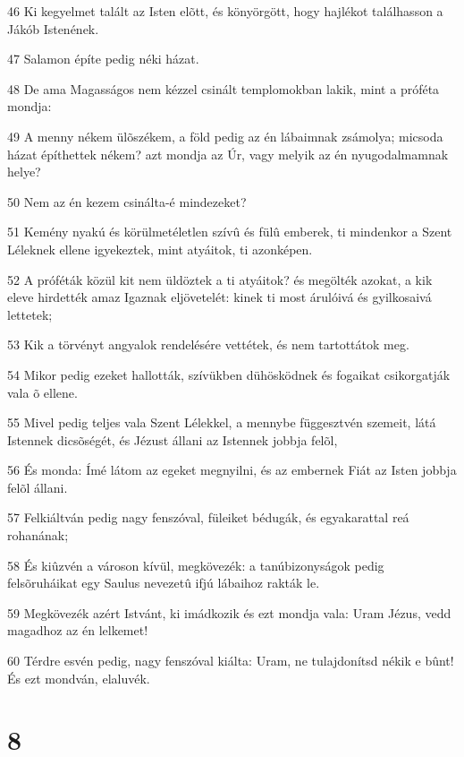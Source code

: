 \par 46 Ki kegyelmet talált az Isten elõtt, és könyörgött, hogy hajlékot  találhasson a Jákób Istenének.
\par 47 Salamon építe pedig néki házat.
\par 48 De ama Magasságos nem kézzel csinált templomokban lakik, mint a próféta mondja:
\par 49 A menny nékem ülõszékem, a föld pedig az én lábaimnak zsámolya; micsoda házat építhettek nékem? azt mondja az Úr, vagy melyik az én nyugodalmamnak helye?
\par 50 Nem az én kezem csinálta-é mindezeket?
\par 51 Kemény nyakú és körülmetéletlen szívû és fülû emberek, ti mindenkor a Szent Léleknek ellene igyekeztek, mint atyáitok, ti azonképen.
\par 52 A próféták közül kit nem üldöztek a ti atyáitok? és megölték azokat, a kik eleve hirdették amaz Igaznak eljövetelét: kinek ti most árulóivá és gyilkosaivá  lettetek;
\par 53 Kik a törvényt angyalok rendelésére vettétek, és nem tartottátok meg.
\par 54 Mikor pedig ezeket hallották, szívükben dühösködnek és fogaikat csikorgatják vala õ ellene.
\par 55 Mivel pedig teljes vala Szent Lélekkel, a mennybe függesztvén szemeit, látá Istennek dicsõségét, és Jézust állani az Istennek jobbja  felõl,
\par 56 És monda: Ímé látom az egeket megnyilni, és az embernek Fiát az Isten jobbja felõl állani.
\par 57 Felkiáltván pedig nagy fenszóval, füleiket bédugák, és egyakarattal reá rohanának;
\par 58 És kiûzvén a városon kívül, megkövezék: a tanúbizonyságok  pedig felsõruháikat egy Saulus nevezetû ifjú lábaihoz rakták le.
\par 59 Megkövezék azért Istvánt, ki imádkozik és ezt mondja vala: Uram Jézus, vedd magadhoz az én lelkemet!
\par 60 Térdre esvén pedig, nagy fenszóval kiálta: Uram, ne tulajdonítsd nékik e bûnt! És ezt mondván, elaluvék.

\chapter{8}

